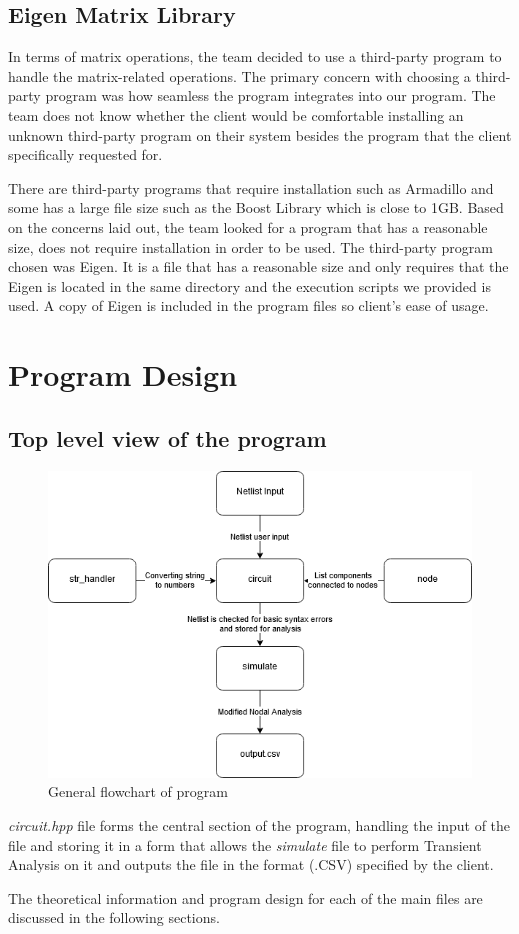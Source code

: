 \documentclass[12pt,a4paper]{article}
\begin{document}
	\subsection{Eigen Matrix Library}
	In terms of matrix operations, the team decided to use a third-party program to handle the matrix-related operations.
	The primary concern with choosing a third-party program was how seamless the program integrates into our program. 
	The team does not know whether the client would be comfortable installing an unknown third-party program on their system 
	besides the program that the client specifically requested for.\par
	There are third-party programs that require installation such as Armadillo and some has a large file size such as the 
	Boost Library which is close to 1GB.
	Based on the concerns laid out, the team looked for a program that has a reasonable size, does not require installation 
	in order to be used. The third-party program chosen was Eigen. It is a file that has a reasonable size and only requires that the
	Eigen is located in the same directory and the execution scripts we provided is used. A copy of Eigen is included in the program
	files so client's ease of usage.
	\pagebreak

\section{Program Design}
	\subsection{Top level view of the program}
	\begin{figure} [h!]
		\centering
		\includegraphics[scale=0.5]{Flow chart.PNG}
		\caption{General flowchart of program}
	\end{figure}
	\textit{circuit.hpp} file forms the central section of the program, handling the input of the file and 
	storing it in a form that allows the \textit{simulate} file to perform Transient Analysis on it and outputs
	the file in the format (.CSV) specified by the client.
	\par
	The theoretical information and program design for each of the main files are discussed in the following 
	sections.
	\pagebreak
\end{document}
